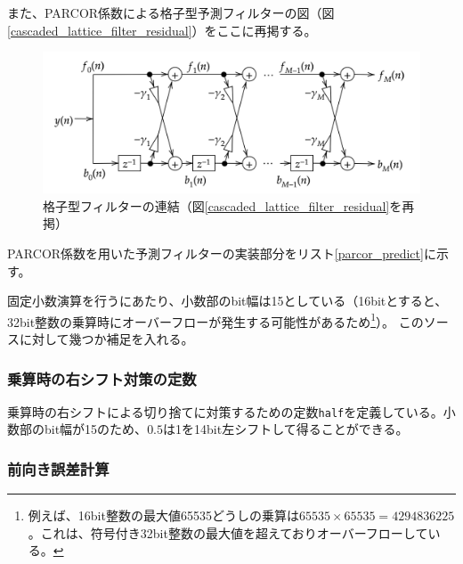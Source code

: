 \documentclass[uplatex,dvipdfmx,b5j,10pt]{jsbook}
\theoremstyle{definition}
\begin{document}
また、PARCOR係数による格子型予測フィルターの図（図\ref{cascaded_lattice_filter_residual}）をここに再掲する。
\begin{figure}[htbp]
  \begin{center}
    \includegraphics[width=120mm]{./figs/cascaded_lattice_filter_residual.png}
    \caption{格子型フィルターの連結（図\ref{cascaded_lattice_filter_residual}を再掲）}
  \end{center}
\end{figure}

PARCOR係数を用いた予測フィルターの実装部分をリスト\ref{parcor_predict}に示す。


固定小数演算を行うにあたり、小数部のbit幅は15としている（16bitとすると、32bit整数の乗算時にオーバーフローが発生する可能性があるため\footnote{例えば、16bit整数の最大値65535どうしの乗算は$65535 \times 65535 = 4294836225$。これは、符号付き32bit整数の最大値を超えておりオーバーフローしている。}）。
このソースに対して幾つか補足を入れる。

\subsubsection{乗算時の右シフト対策の定数}



乗算時の右シフトによる切り捨てに対策するための定数\texttt{half}を定義している。小数部のbit幅が15のため、$0.5$は1を14bit左シフトして得ることができる。

\subsubsection{前向き誤差計算}


\end{document}
